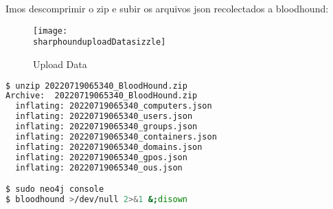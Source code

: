 \documentclass[a4paper]{article}
\newcommand{\sharphounduploadDatasizzle}{sharphound_uploadData_sizzle.png}
\begin{document}
Imos descomprimir o zip e subir os arquivos json recolectados a bloodhound:
       \begin{figure}[h]
                \centering
                \texttt{[image: \\sharphounduploadDatasizzle]}
                \caption{Upload Data}
        \end{figure}
\clearpage
\vspace*{-1.2cm}
        \begin{lstlisting}[language=Bash, caption=bloodhound, linewidth=17.7cm]
$ unzip 20220719065340_BloodHound.zip
Archive:  20220719065340_BloodHound.zip
  inflating: 20220719065340_computers.json
  inflating: 20220719065340_users.json
  inflating: 20220719065340_groups.json
  inflating: 20220719065340_containers.json
  inflating: 20220719065340_domains.json
  inflating: 20220719065340_gpos.json
  inflating: 20220719065340_ous.json

$ sudo neo4j console
$ bloodhound >/dev/null 2>&1 &;disown\end{lstlisting}             
\end{document}
